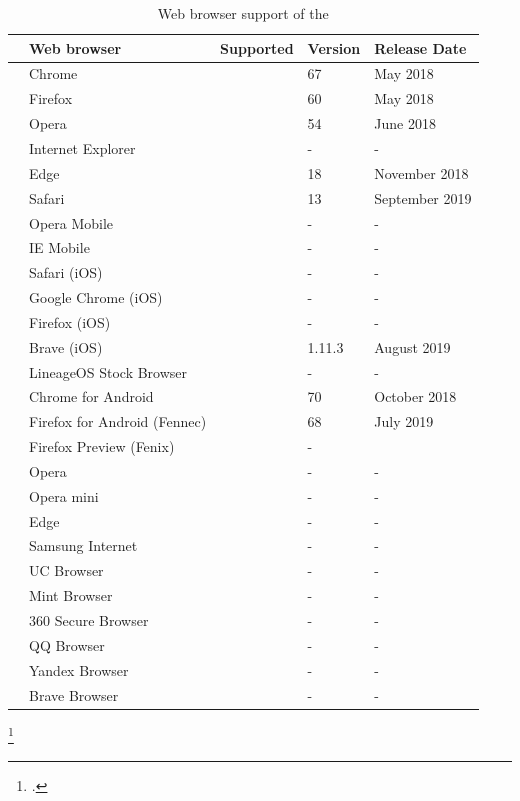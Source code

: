 \begin{table}[ht]
	\begin{tabularx}{\textwidth}{l|p{5.3cm}|p{2cm}|p{1.7cm}|p{3.08cm}}
		& Web browser & Supported & Version & Release Date \\
		\hline
		\parbox[t]{2mm}{} & Chrome & \OK & 67 & May 2018 \\
		& Firefox & \OK & 60 & May 2018 \\
		& Opera & \OK & 54 & June 2018 \\
		& Internet Explorer & \NOOK & - & - \\
		& Edge & \OK & 18 & November 2018 \\
		& Safari & \OK & 13 & September 2019 \\
		\hline
		\parbox[t]{2mm}{} & Opera Mobile & \NOOK & - & - \\
		& IE Mobile & \NOOK & - & - \\
		& Safari (iOS) & \NOOK & - & - \\
		& Google Chrome (iOS) & \NOOK & - & - \\
		& Firefox (iOS) & \NOOK & - & - \\
		& Brave (iOS) & \OK & 1.11.3 & August 2019 \\
		\hline
		\parbox[t]{2mm}{} & LineageOS Stock Browser & \NOOK & - & - \\
		& Chrome for Android & \OK & 70 & October 2018 \\
		& Firefox for Android (Fennec) & \OK & 68 & July 2019 \\
		& Firefox Preview (Fenix) & \NOOK & - \\
		& Opera & \NOOK & - & - \\
		& Opera mini & \NOOK & - & - \\
		& Edge & \NOOK & - & - \\
		& Samsung Internet & \NOOK & - & - \\
		& UC Browser & \NOOK & - & - \\
		& Mint Browser & \NOOK & - & - \\
		& 360 Secure Browser & \NOOK & - & - \\
		& QQ Browser & \NOOK & - & - \\
		& Yandex Browser & \NOOK & - & - \\
		& Brave Browser & \NOOK & - & -
	\end{tabularx}
	\caption[Web browser support of the \wa]{Web browser support of the \wa\footnotemark}
	\label{tab:browser-support}
\end{table}
\footcitetexts[Sources:][]{chrome-webauthn}{firefox-webauthn}{safari-webauthn}{chrome-android-webauthn}[a detailed analysis of Android web browsers is available on the \gls{usb} flash drive in the appendix.]{firefox-android-webauthn}

